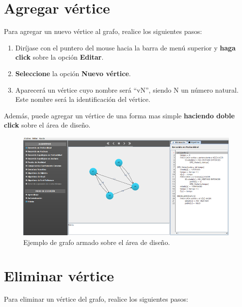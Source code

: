 \documentclass{book}
\begin{document}
\section{Agregar vértice}

Para agregar un nuevo vértice al grafo, realice los siguientes pasos:
\medskip

\begin{enumerate}
	\itemsep=8pt \topsep=0pt \partopsep=0pt \parskip=0pt \parsep=0pt

	\item Diríjase con el puntero del mouse hacia la barra de menú superior y \textbf{haga click} sobre la opción \textbf{Editar}.

	\item \textbf{Seleccione} la opción \textbf{Nuevo vértice}.

	\item Aparecerá un vértice cuyo nombre será ``vN'', siendo N un número natural. Este nombre será la identificación del vértice.

\end{enumerate}
\medskip

Además, puede agregar un vértice de una forma mas simple \textbf{haciendo doble click} sobre el área de diseño.
\bigskip


\begin{figure}[H]
	\centering
	\includegraphics[width=1.0\textwidth]{images/ventanas/03.png}
	\medskip
	\caption{Ejemplo de grafo armado sobre el área de diseño.}
\end{figure}
\bigskip



\section{Eliminar vértice}

Para eliminar un vértice del grafo, realice los siguientes pasos:
\medskip
\end{document}
